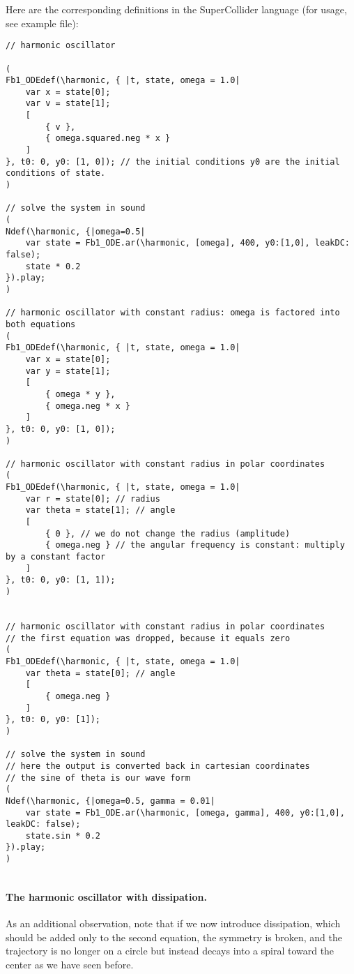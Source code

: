 \documentclass{article}
\begin{document}
Here are the corresponding definitions in the SuperCollider language (for usage, see example file):

\begin{lstlisting}[caption=The symmetric oscillator and the oscillation on the circle.]
// harmonic oscillator

(
Fb1_ODEdef(\harmonic, { |t, state, omega = 1.0|
	var x = state[0];
	var v = state[1];
	[
		{ v },
		{ omega.squared.neg * x }
	]
}, t0: 0, y0: [1, 0]); // the initial conditions y0 are the initial conditions of state.
)

// solve the system in sound
(
Ndef(\harmonic, {|omega=0.5|
	var state = Fb1_ODE.ar(\harmonic, [omega], 400, y0:[1,0], leakDC: false);
	state * 0.2
}).play;
)

// harmonic oscillator with constant radius: omega is factored into both equations
(
Fb1_ODEdef(\harmonic, { |t, state, omega = 1.0|
	var x = state[0];
	var y = state[1];
	[
		{ omega * y },
		{ omega.neg * x }
	]
}, t0: 0, y0: [1, 0]);
)

// harmonic oscillator with constant radius in polar coordinates
(
Fb1_ODEdef(\harmonic, { |t, state, omega = 1.0|
	var r = state[0]; // radius
	var theta = state[1]; // angle
	[
		{ 0 }, // we do not change the radius (amplitude)
		{ omega.neg } // the angular frequency is constant: multiply by a constant factor
	]
}, t0: 0, y0: [1, 1]);
)


// harmonic oscillator with constant radius in polar coordinates
// the first equation was dropped, because it equals zero
(
Fb1_ODEdef(\harmonic, { |t, state, omega = 1.0|
	var theta = state[0]; // angle
	[
		{ omega.neg }
	]
}, t0: 0, y0: [1]);
)

// solve the system in sound
// here the output is converted back in cartesian coordinates
// the sine of theta is our wave form
(
Ndef(\harmonic, {|omega=0.5, gamma = 0.01|
	var state = Fb1_ODE.ar(\harmonic, [omega, gamma], 400, y0:[1,0], leakDC: false);
	state.sin * 0.2 
}).play;
)


\end{lstlisting}



\paragraph{The harmonic oscillator with dissipation.}
As an additional observation, note that if we now introduce dissipation, which should be added only to the second equation, the symmetry is broken, and the trajectory is no longer on a circle but instead decays into a spiral toward the center as we have seen before.
\end{document}

